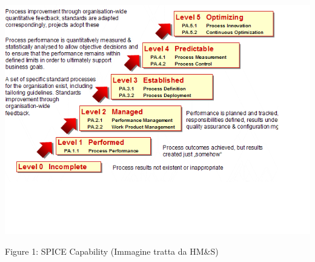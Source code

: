 \begin{center}
	\includegraphics[width=0.7\linewidth]{../immagini/Process_Level.jpg}
\end{center}
\begin{center}
Figure 1: SPICE Capability (Immagine tratta da HM\&S)
\end{center}

	